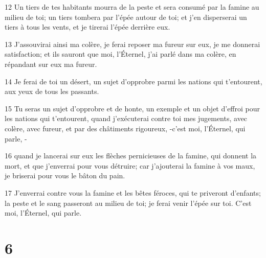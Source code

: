 \par 12 Un tiers de tes habitants mourra de la peste et sera consumé par la famine au milieu de toi; un tiers tombera par l'épée autour de toi; et j'en disperserai un tiers à tous les vents, et je tirerai l'épée derrière eux.
\par 13 J'assouvirai ainsi ma colère, je ferai reposer ma fureur sur eux, je me donnerai satisfaction; et ils sauront que moi, l'Éternel, j'ai parlé dans ma colère, en répandant sur eux ma fureur.
\par 14 Je ferai de toi un désert, un sujet d'opprobre parmi les nations qui t'entourent, aux yeux de tous les passants.
\par 15 Tu seras un sujet d'opprobre et de honte, un exemple et un objet d'effroi pour les nations qui t'entourent, quand j'exécuterai contre toi mes jugements, avec colère, avec fureur, et par des châtiments rigoureux, -c'est moi, l'Éternel, qui parle, -
\par 16 quand je lancerai sur eux les flèches pernicieuses de la famine, qui donnent la mort, et que j'enverrai pour vous détruire; car j'ajouterai la famine à vos maux, je briserai pour vous le bâton du pain.
\par 17 J'enverrai contre vous la famine et les bêtes féroces, qui te priveront d'enfants; la peste et le sang passeront au milieu de toi; je ferai venir l'épée sur toi. C'est moi, l'Éternel, qui parle.

\chapter{6}

